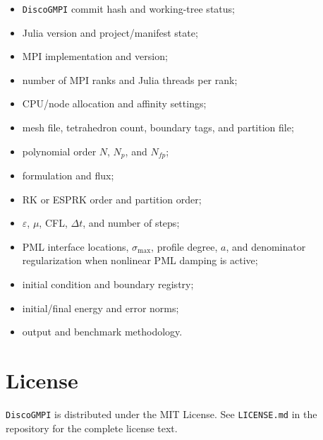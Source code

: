 \documentclass[11pt,oneside]{book}
\newcommand{\pkg}{\texttt{DiscoGMPI}}
\newcommand{\code}[1]{\texttt{#1}}
\begin{document}
\begin{itemize}[leftmargin=*]
  \item \pkg{} commit hash and working-tree status;
  \item Julia version and project/manifest state;
  \item MPI implementation and version;
  \item number of MPI ranks and Julia threads per rank;
  \item CPU/node allocation and affinity settings;
  \item mesh file, tetrahedron count, boundary tags, and partition file;
  \item polynomial order $N$, $N_p$, and $N_{fp}$;
  \item formulation and flux;
  \item RK or ESPRK order and partition order;
  \item $\varepsilon$, $\mu$, CFL, $\Delta t$, and number of steps;
  \item PML interface locations, $\sigma_{\max}$, profile degree, $a$, and
        denominator regularization when nonlinear PML damping is active;
  \item initial condition and boundary registry;
  \item initial/final energy and error norms;
  \item output and benchmark methodology.
\end{itemize}

\backmatter

\chapter*{License}

\pkg{} is distributed under the MIT License. See \code{LICENSE.md} in the
repository for the complete license text.
\end{document}
